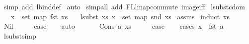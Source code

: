 \begin{isabellebody}
%
\isadelimproof
%
\endisadelimproof
%
\isatagproof
{}\isamarkupfalse%
\ {\isacharparenleft}{\kern0pt}simp\ add{\isacharcolon}{\kern0pt}\ lbind{\isacharunderscore}{\kern0pt}def{\isacharparenright}{\kern0pt}\isanewline
{}\isamarkupfalse%
\ auto\isanewline
{}\isamarkupfalse%
\ {\isacharparenleft}{\kern0pt}simp{\isacharunderscore}{\kern0pt}all\ add{\isacharcolon}{\kern0pt}\ FL{\isacharunderscore}{\kern0pt}lmap{\isacharunderscore}{\kern0pt}commute\ image{\isacharunderscore}{\kern0pt}iff{\isacharparenright}{\kern0pt}\isanewline
{}\isamarkupfalse%
%
\endisatagproof
{\isafoldproof}%
%
\isadelimproof
%
\endisadelimproof
%
\isadelimdocument
%
\endisadelimdocument
%
\isatagdocument
%
\isamarkuptrue%
%
\endisatagdocument
{\isafolddocument}%
%
\isadelimdocument
%
\endisadelimdocument
{}\isamarkupfalse%
\ lsubst{\isacharunderscore}{\kern0pt}cdom{\isacharcolon}{\kern0pt}\isanewline
\ \ \ {\isachardoublequoteopen}x\ {\isasymin}\ set\ {\isacharparenleft}{\kern0pt}map\ fst\ xs{\isacharparenright}{\kern0pt}{\isachardoublequoteclose}\isanewline
\ \ \ {\isachardoublequoteopen}lsubst\ xs\ x\ {\isasymin}\ set\ {\isacharparenleft}{\kern0pt}map\ snd\ xs{\isacharparenright}{\kern0pt}{\isachardoublequoteclose}\isanewline
%
\isadelimproof
%
\endisadelimproof
%
\isatagproof
{}\isamarkupfalse%
\ assms\isanewline
{}\isamarkupfalse%
\ {\isacharparenleft}{\kern0pt}induct\ xs{\isacharparenright}{\kern0pt}\isanewline
\ \ \isamarkupfalse%
\ Nil\isanewline
\ \ \isamarkupfalse%
\ \isamarkupfalse%
\ {\isacharquery}{\kern0pt}case\isanewline
\ \ \isamarkupfalse%
\ auto\isanewline
\ \ \isamarkupfalse%
\isanewline
{}\isamarkupfalse%
\isanewline
\ \ \isamarkupfalse%
\ {\isacharparenleft}{\kern0pt}Cons\ a\ xs{\isacharparenright}{\kern0pt}\isanewline
\ \ \isamarkupfalse%
\ \isamarkupfalse%
\ {\isacharquery}{\kern0pt}case\isanewline
\ \ \isamarkupfalse%
\ {\isacharparenleft}{\kern0pt}cases\ {\isachardoublequoteopen}x\ {\isacharequal}{\kern0pt}\ fst\ a{\isachardoublequoteclose}{\isacharparenright}{\kern0pt}\isanewline
\ \ \isamarkupfalse%
\ lsubst{\isacharunderscore}{\kern0pt}simp\isanewline
\ \ \isamarkupfalse%

\end{isabellebody}

